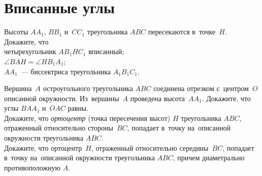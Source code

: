 
\section*{Вписанные углы}


\begin{problems}
    \let\bfseries\relax

\item
Высоты $A A_1$, $B B_1$ и~$C C_1$ треугольника $ABC$ пересекаются в~точке~$H$.
Докажите, что
\\
\subproblem четырехугольник $A B_1 H C_1$ вписанный;
\\
\subproblem $\angle BAH = \angle H B_1 A_1$;
\\
\subproblem $A A_1$~--- биссектриса треугольника $A_1 B_1 C_1$.

\item
\subproblem
Вершина~$A$ остроугольного треугольника $ABC$ соединена отрезком с~центром~$O$
описанной окружности.
Из~вершины~$A$ проведена высота~$A A_1$.
Докажите, что углы $B A A_1$ и~$O A C$ равны.
\\
\subproblem
Докажите, что \emph{ортоцентр} (точка пересечения высот) $H$
треугольника $ABC$, отраженный относительно стороны~$BC$, попадает в~точку
на~описанной окружности треугольника $ABC$.
\\
\subproblem
Докажите, что ортоцентр~$H$, отраженный относительно середины~$BC$, попадает
в~точку на~описанной окружности треугольника $ABC$, причем диаметрально
противоположную $A$.

\end{problems}
\resetproblem

